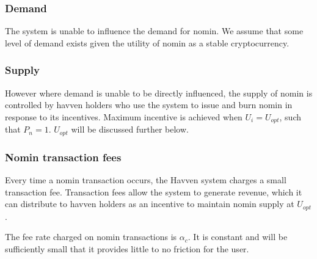\begin{center}
\end{center}
	
\subsubsection*{Demand}

\noindent The system is unable to influence the demand for nomin. We assume that some level of demand exists given the utility of nomin as a stable cryptocurrency.

\subsubsection*{Supply}

\noindent However where demand is unable to be directly influenced, the supply of nomin is controlled by havven holders who use the system to issue and burn nomin in response to its incentives. Maximum incentive is achieved when $U_i = U_{opt}$, such that $P_n = 1$. $U_{opt}$ will be discussed further below. \\

\newpage
\subsubsection{Nomin transaction fees} Every time a nomin transaction occurs, the Havven system charges a small transaction fee. Transaction fees allow the system to generate revenue, which it can distribute to havven holders as an incentive to maintain nomin supply at $U_{opt}$.

\noindent The fee rate charged on nomin transactions is $\alpha_c$. It is constant and will be sufficiently small that it provides little to no friction for the user.\\

